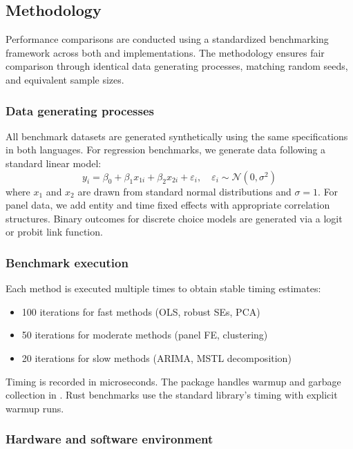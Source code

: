 \subsection{Methodology} \label{sec:benchmark-methodology}

Performance comparisons are conducted using a standardized benchmarking
framework across both  and  implementations.
The methodology ensures fair comparison through identical data generating
processes, matching random seeds, and equivalent sample sizes.

\subsubsection{Data generating processes}

All benchmark datasets are generated synthetically using the same specifications
in both languages. For regression benchmarks, we generate data following a
standard linear model:
\begin{equation}
  y_i = \beta_0 + \beta_1 x_{1i} + \beta_2 x_{2i} + \varepsilon_i, \quad
  \varepsilon_i \sim \mathcal{N}(0, \sigma^2)
\end{equation}
where $x_1$ and $x_2$ are drawn from standard normal distributions and
$\sigma = 1$. For panel data, we add entity and time fixed effects with
appropriate correlation structures. Binary outcomes for discrete choice
models are generated via a logit or probit link function.

\subsubsection{Benchmark execution}

Each method is executed multiple times to obtain stable timing estimates:
\begin{itemize}
  \item 100 iterations for fast methods (OLS, robust SEs, PCA)
  \item 50 iterations for moderate methods (panel FE, clustering)
  \item 20 iterations for slow methods (ARIMA, MSTL decomposition)
\end{itemize}
Timing is recorded in microseconds. The  package
\citep{microbenchmark} handles warmup and garbage collection in .
Rust benchmarks use the standard library's  timing with
explicit warmup runs.

\subsubsection{Hardware and software environment}

